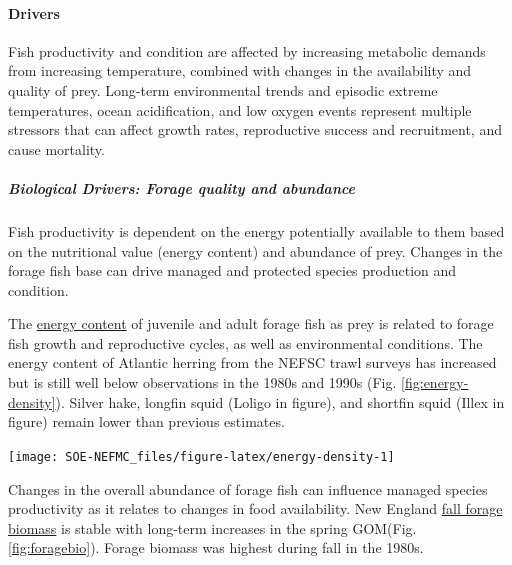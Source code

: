 \documentclass[
  10pt,
]{article}
\let\origfigure\figure
\let\endorigfigure\endfigure
\renewenvironment{figure}[1][2] {
    \expandafter\origfigure\expandafter[H]
} {
    \endorigfigure
}
\begin{document}
\hypertarget{drivers-2}{%
\paragraph{Drivers}\label{drivers-2}}

Fish productivity and condition are affected by increasing metabolic demands from increasing temperature, combined with changes in the availability and quality of prey. Long-term environmental trends and episodic extreme temperatures, ocean acidification, and low oxygen events represent multiple stressors that can affect growth rates, reproductive success and recruitment, and cause mortality.

\hypertarget{biological-drivers-forage-quality-and-abundance}{%
\subparagraph{Biological Drivers: Forage quality and abundance}\label{biological-drivers-forage-quality-and-abundance}}

Fish productivity is dependent on the energy potentially available to them based on the nutritional value (energy content) and abundance of prey. Changes in the forage fish base can drive managed and protected species production and condition.

The \href{https://noaa-edab.github.io/catalog/forage-fish-energy-density.html}{energy content} of juvenile and adult forage fish as prey is related to forage fish growth and reproductive cycles, as well as environmental conditions. The energy content of Atlantic herring from the NEFSC trawl surveys has increased but is still well below observations in the 1980s and 1990s (Fig. \ref{fig:energy-density}). Silver hake, longfin squid (Loligo in figure), and shortfin squid (Illex in figure) remain lower than previous estimates.

\begin{figure}

{\centering \texttt{[image: SOE-NEFMC\_files/figure-latex/energy-density-1]} 

}

\caption{Forage fish energy density mean and standard deviation by season and year, compared with 1980s (solid line; Steimle and Terranove 1985) and 1990s (dashed line; Lawson et al. 1998) values.}\label{fig:energy-density}
\end{figure}

Changes in the overall abundance of forage fish can influence managed species productivity as it relates to changes in food availability. New England \href{https://noaa-edab.github.io/catalog/forage-fish-index.html}{fall forage biomass} is stable with long-term increases in the spring GOM(Fig. \ref{fig:foragebio}). Forage biomass was highest during fall in the 1980s.
\end{document}
